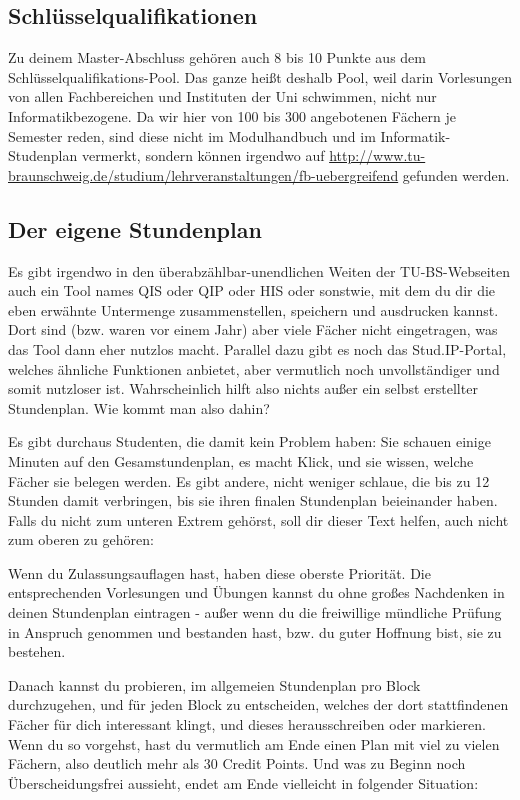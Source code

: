 \subsection{Schlüsselqualifikationen}
Zu deinem Master-Abschluss gehören auch 8 bis 10 Punkte aus dem Schlüsselqualifikations-Pool. Das ganze heißt deshalb Pool, weil darin Vorlesungen von allen Fachbereichen und Instituten der Uni schwimmen, nicht nur Informatikbezogene. Da wir hier von 100 bis 300 angebotenen Fächern je Semester reden, sind diese nicht im Modulhandbuch und im Informatik-Studenplan vermerkt, sondern können irgendwo auf \url{http://www.tu-braunschweig.de/studium/lehrveranstaltungen/fb-uebergreifend} gefunden werden.

\subsection{Der eigene Stundenplan}
Es gibt irgendwo in den überabzählbar-unendlichen Weiten der TU-BS-Webseiten auch ein Tool names QIS oder QIP oder HIS oder sonstwie, mit dem du dir die eben erwähnte Untermenge zusammenstellen, speichern und ausdrucken kannst. Dort sind (bzw. waren vor einem Jahr) aber viele Fächer nicht eingetragen, was das Tool dann eher nutzlos macht. Parallel dazu gibt es noch das Stud.IP-Portal, welches ähnliche Funktionen anbietet, aber vermutlich noch unvollständiger und somit nutzloser ist. Wahrscheinlich hilft also nichts außer ein selbst erstellter Stundenplan. Wie kommt man also dahin?

Es gibt durchaus Studenten, die damit kein Problem haben: Sie schauen einige Minuten auf den Gesamstundenplan, es macht Klick, und sie wissen, welche Fächer sie belegen werden. Es gibt andere, nicht weniger schlaue, die bis zu 12 Stunden damit verbringen, bis sie ihren finalen Stundenplan beieinander haben. Falls du nicht zum unteren Extrem gehörst, soll dir dieser Text helfen, auch nicht zum oberen zu gehören:

Wenn du Zulassungsauflagen hast, haben diese oberste Priorität. Die entsprechenden Vorlesungen und Übungen kannst du ohne großes Nachdenken in deinen Stundenplan eintragen - außer wenn du die freiwillige mündliche Prüfung in Anspruch genommen und bestanden hast, bzw. du guter Hoffnung bist, sie zu bestehen.

Danach kannst du probieren, im allgemeien Stundenplan pro Block durchzugehen, und für jeden Block zu entscheiden, welches der dort stattfindenen Fächer für dich interessant klingt, und dieses herausschreiben oder markieren. Wenn du so vorgehst, hast du vermutlich am Ende einen Plan mit viel zu vielen Fächern, also deutlich mehr als 30 Credit Points. Und was zu Beginn noch Überscheidungsfrei aussieht, endet am Ende vielleicht in folgender Situation:

